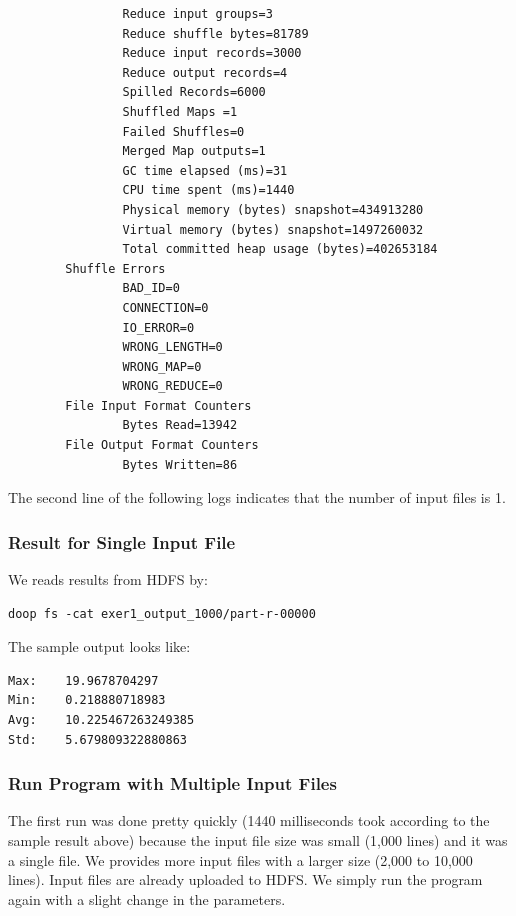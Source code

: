 \begin{lstlisting}
                Reduce input groups=3
                Reduce shuffle bytes=81789
                Reduce input records=3000
                Reduce output records=4
                Spilled Records=6000
                Shuffled Maps =1
                Failed Shuffles=0
                Merged Map outputs=1
                GC time elapsed (ms)=31
                CPU time spent (ms)=1440
                Physical memory (bytes) snapshot=434913280
                Virtual memory (bytes) snapshot=1497260032
                Total committed heap usage (bytes)=402653184
        Shuffle Errors
                BAD_ID=0
                CONNECTION=0
                IO_ERROR=0
                WRONG_LENGTH=0
                WRONG_MAP=0
                WRONG_REDUCE=0
        File Input Format Counters
                Bytes Read=13942
        File Output Format Counters
                Bytes Written=86

\end{lstlisting}

The second line of the following logs indicates that the number of input files is 1.

\subsubsection{Result for Single Input File}

We reads results from HDFS by:

\begin{lstlisting}
doop fs -cat exer1_output_1000/part-r-00000
\end{lstlisting}

The sample output looks like:

\begin{lstlisting}
Max:    19.9678704297
Min:    0.218880718983
Avg:    10.225467263249385
Std:    5.679809322880863
\end{lstlisting}

\subsubsection{Run Program with Multiple Input Files}

The first run was done pretty quickly (1440 milliseconds took according to the
sample result above) because the input file size was small (1,000 lines) and it
was a single file. We provides more input files with a larger size (2,000 to
10,000 lines). Input files are already uploaded to HDFS. We simply run the
program again with a slight change in the parameters.

